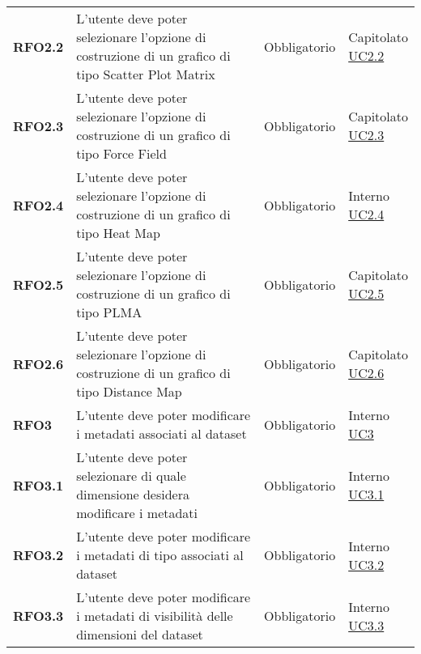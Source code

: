 \begin{longtable}[H]{| >{\raggedright\bfseries}m{20mm} | >{\raggedright}m{90mm} | >{\centering}m{25mm} | >{\centering\arraybackslash}m{30mm}|}
    RFO2.2
    & L'utente deve poter selezionare l'opzione di costruzione di un grafico di tipo Scatter Plot
    Matrix
    & Obbligatorio
    & \makecell{ Capitolato \\   \hyperref[ssub:uc2.2]{UC2.2}}\\

    RFO2.3
    & L'utente deve poter selezionare l'opzione di costruzione di un grafico di tipo Force Field
    & Obbligatorio
    & \makecell{ Capitolato \\  \hyperref[ssub:uc2.3]{UC2.3}}\\

    RFO2.4
    & L'utente deve poter selezionare l'opzione di costruzione di un grafico di tipo Heat Map
    & Obbligatorio
    & \makecell{ Interno \\  \hyperref[ssub:uc2.4]{UC2.4}}\\

    RFO2.5
    & L'utente deve poter selezionare l'opzione di costruzione di un grafico di tipo PLMA
    & Obbligatorio
    & \makecell{Capitolato \\ \hyperref[ssub:uc2.5]{UC2.5}}\\

    RFO2.6
    & L'utente deve poter selezionare l'opzione di costruzione di un grafico di tipo Distance Map
    & Obbligatorio
    & \makecell{Capitolato \\ \hyperref[ssub:uc2.6]{UC2.6}}\\

    RFO3
    & L'utente deve poter modificare i metadati associati al dataset
    & Obbligatorio
    & \makecell{ Interno \\  \hyperref[sub:uc3]{UC3} }\\

    RFO3.1
    & L'utente deve poter selezionare di quale dimensione desidera modificare i metadati
    & Obbligatorio
    & \makecell{ Interno \\\hyperref[ssub:uc3.1]{UC3.1} }\\

    RFO3.2
    & L'utente deve poter modificare i metadati di tipo associati al dataset
    & Obbligatorio
    & \makecell{ Interno \\\hyperref[ssub:uc3.2]{UC3.2} }\\

    RFO3.3
    & L'utente deve poter modificare i metadati di visibilità delle dimensioni del dataset
    & Obbligatorio
    & \makecell{ Interno \\  \hyperref[ssub:uc3.3]{UC3.3} }\\


\end{longtable}
